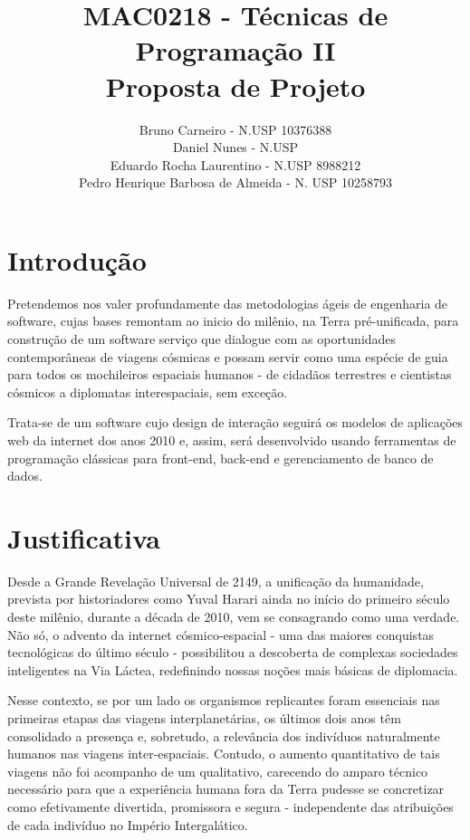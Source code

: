 \documentclass[12pt]{exam}
\title{MAC0218 - Técnicas de Programação II \\ Proposta de Projeto}
\author{Bruno Carneiro - N.USP 10376388 \\ Daniel Nunes - N.USP \\ Eduardo Rocha Laurentino - N.USP 8988212 \\ Pedro Henrique Barbosa de Almeida - N. USP 10258793}
\date{}
\begin{document}
        \clearpage
        \pagestyle{plain}
        \maketitle
        
\section{Introdução} 
        
        
        Pretendemos nos valer profundamente das metodologias ágeis de engenharia de software, cujas bases remontam ao inicio do milênio, na Terra pré-unificada, para construção de um software serviço que dialogue com as oportunidades contemporâneas de viagens cósmicas e possam servir como uma espécie de guia para todos os mochileiros espaciais humanos - de cidadãos terrestres e cientistas cósmicos a diplomatas interespaciais, sem exceção. 
        
        Trata-se de um software cujo design de interação seguirá os modelos de aplicações web da internet dos anos 2010 e, assim, será desenvolvido usando ferramentas de programação clássicas para front-end, back-end e gerenciamento de banco de dados. 

\section{Justificativa}
        
        Desde a Grande Revelação Universal de 2149, a unificação da humanidade, prevista por historiadores como Yuval Harari ainda no início do primeiro século deste milênio, durante a década de 2010, vem se consagrando como uma verdade. Não só, o advento da internet cósmico-espacial - uma das maiores conquistas tecnológicas do último século - possibilitou a descoberta de complexas sociedades inteligentes na Via Láctea, redefinindo nossas noções mais básicas de diplomacia.
        
        Nesse contexto, se por um lado os organismos replicantes foram essenciais nas primeiras etapas das viagens interplanetárias, os últimos dois anos têm consolidado a presença e, sobretudo, a relevância dos indivíduos naturalmente humanos nas viagens inter-espaciais. Contudo, o aumento quantitativo de tais viagens não foi acompanho de um qualitativo, carecendo do amparo técnico necessário para que a experiência humana fora da Terra pudesse se concretizar como efetivamente divertida, promissora e segura - independente das atribuições de cada indivíduo no Império Intergalático. 
        
\end{document}
